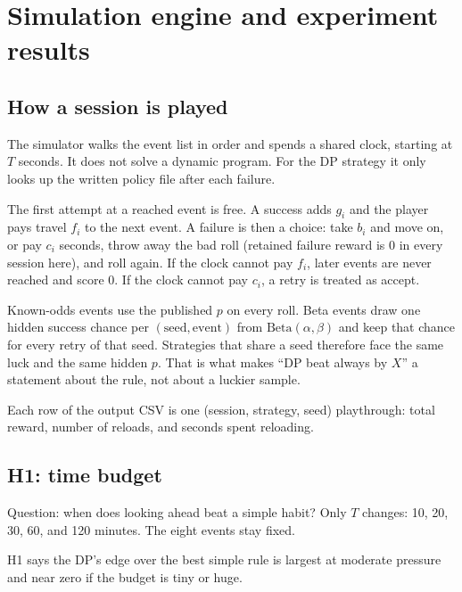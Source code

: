 \documentclass[11pt,a4paper]{article}
\newcommand{\who}[1]{}
\begin{document}
\section{Simulation engine and experiment results}
\subsection{How a session is played\who{Yera}}
\label{sec:sim}
The simulator walks the event list in order and spends a shared clock, starting at $T$ seconds. It does not solve a dynamic program. For the DP strategy it only looks up the written policy file after each failure.

The first attempt at a reached event is free. A success adds $g_i$ and the player pays travel $f_i$ to the next event. A failure is then a choice: take $b_i$ and move on, or pay $c_i$ seconds, throw away the bad roll (retained failure reward is 0 in every session here), and roll again. If the clock cannot pay $f_i$, later events are never reached and score 0. If the clock cannot pay $c_i$, a retry is treated as accept.

Known-odds events use the published $p$ on every roll. Beta events draw one hidden success chance per $(\mathrm{seed},\mathrm{event})$ from $\mathrm{Beta}(\alpha,\beta)$ and keep that chance for every retry of that seed. Strategies that share a seed therefore face the same luck and the same hidden $p$. That is what makes ``DP beat always by $X$'' a statement about the rule, not about a luckier sample.

Each row of the output CSV is one (session, strategy, seed) playthrough: total reward, number of reloads, and seconds spent reloading.

\subsection{H1: time budget\who{Yera}}
\label{sec:H1}
Question: when does looking ahead beat a simple habit? Only $T$ changes: 10, 20, 30, 60, and 120 minutes. The eight events stay fixed.

H1 says the DP's edge over the best simple rule is largest at moderate pressure and near zero if the budget is tiny or huge.
\end{document}
